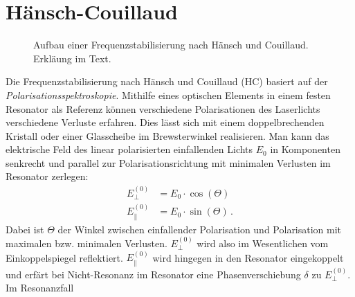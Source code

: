 \section{Hänsch-Couillaud}\label{sec:haensch-couillaud}
\begin{figure}[h]
 	\centering
	\caption[Hänsch-Couillaud - Aufbau]{Aufbau
	einer Frequenzstabilisierung nach Hänsch
	und Couillaud. Erkläung im Text.}\label{fig:haensch-couillaud_aufbau}
\end{figure}
Die Frequenzstabilisierung nach Hänsch und Couillaud (HC)
basiert auf der \textit{Polarisationsspektroskopie}. Mithilfe eines
optischen Elements in einem festen Resonator als Referenz können verschiedene
Polarisationen des Laserlichts verschiedene Verluste erfahren. Dies lässt sich
mit einem doppelbrechenden Kristall oder einer Glasscheibe im Brewsterwinkel
realisieren. Man kann das elektrische Feld des linear polarisierten einfallenden
Lichts $E_0$ in Komponenten senkrecht und parallel zur Polarisationsrichtung mit
minimalen Verlusten im Resonator zerlegen:
\begin{equation}\label{eq:haensch-couillaud_01}
	\begin{split}
		E_{\perp}^{(0)} & = E_0\cdot\cos{(\Theta)}\\
		E_{\parallel}^{(0)} & = E_0\cdot\sin{(\Theta)}\,.
	\end{split}
\end{equation}
Dabei ist $\Theta$ der Winkel zwischen einfallender Polarisation und
Polarisation mit maximalen bzw. minimalen Verlusten. $E_{\perp}^{(0)}$ wird also
im Wesentlichen vom Einkoppelspiegel reflektiert. $E_{\parallel}^{(0)}$
wird hingegen in den Resonator eingekoppelt und erfärt bei Nicht-Resonanz im
Resonator eine Phasenverschiebung $\delta$ zu $E_{\perp}^{(0)}$. Im Resonanzfall
